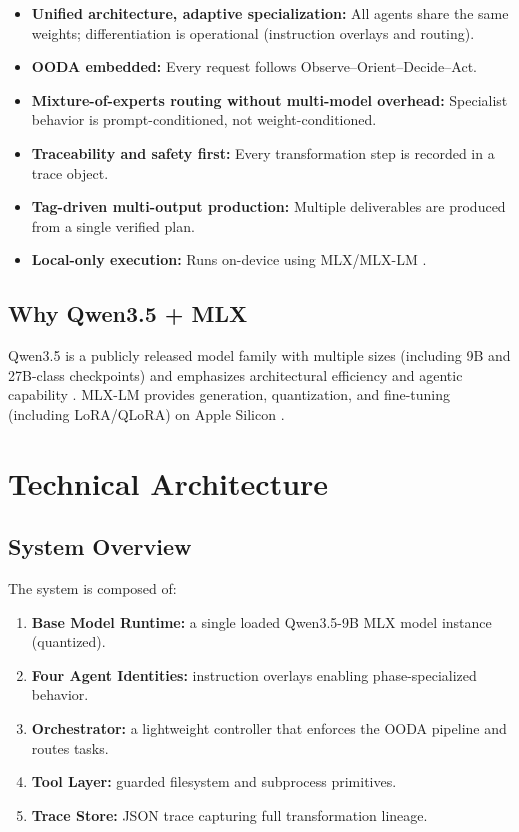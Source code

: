\documentclass[11pt]{article}
\begin{document}
\begin{itemize}
  \item \textbf{Unified architecture, adaptive specialization:} All agents share the same weights; differentiation is operational (instruction overlays and routing).
  \item \textbf{OODA embedded:} Every request follows Observe--Orient--Decide--Act.
  \item \textbf{Mixture-of-experts routing without multi-model overhead:} Specialist behavior is prompt-conditioned, not weight-conditioned.
  \item \textbf{Traceability and safety first:} Every transformation step is recorded in a trace object.
  \item \textbf{Tag-driven multi-output production:} Multiple deliverables are produced from a single verified plan.
  \item \textbf{Local-only execution:} Runs on-device using MLX/MLX-LM \cite{MLX_GitHub, MLXLM_Readme}.
\end{itemize}

\subsection{Why Qwen3.5 + MLX}

Qwen3.5 is a publicly released model family with multiple sizes (including 9B and 27B-class checkpoints) and emphasizes architectural efficiency and agentic capability \cite{Qwen35_GitHub, Qwen35_27B_Card, Qwen35_9B_BaseCard}.
MLX-LM provides generation, quantization, and fine-tuning (including LoRA/QLoRA) on Apple Silicon \cite{MLXLM_Readme, MLXLM_LoRA}.

\section{Technical Architecture}

\subsection{System Overview}

The system is composed of:
\begin{enumerate}
  \item \textbf{Base Model Runtime:} a single loaded Qwen3.5-9B MLX model instance (quantized).
  \item \textbf{Four Agent Identities:} instruction overlays enabling phase-specialized behavior.
  \item \textbf{Orchestrator:} a lightweight controller that enforces the OODA pipeline and routes tasks.
  \item \textbf{Tool Layer:} guarded filesystem and subprocess primitives.
  \item \textbf{Trace Store:} JSON trace capturing full transformation lineage.
\end{enumerate}
\end{document}
